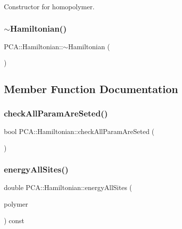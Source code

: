 Constructor for homopolymer. 

\hypertarget{class_p_c_a_1_1_hamiltonian_a87dcca06e1580312d8ffd4ef7fcad219}{}\label{class_p_c_a_1_1_hamiltonian_a87dcca06e1580312d8ffd4ef7fcad219} 
\subsubsection{\texorpdfstring{$\sim$\+Hamiltonian()}{~Hamiltonian()}}
{\footnotesize\ttfamily P\+C\+A\+::\+Hamiltonian\+::$\sim$\+Hamiltonian (\begin{DoxyParamCaption}{ }\end{DoxyParamCaption})}



\subsection{Member Function Documentation}
\hypertarget{class_p_c_a_1_1_hamiltonian_a3c9bddc6635c2a5a2ba0b2956126eb79}{}\label{class_p_c_a_1_1_hamiltonian_a3c9bddc6635c2a5a2ba0b2956126eb79} 
\subsubsection{\texorpdfstring{check\+All\+Param\+Are\+Seted()}{checkAllParamAreSeted()}}
{\footnotesize\ttfamily bool P\+C\+A\+::\+Hamiltonian\+::check\+All\+Param\+Are\+Seted (\begin{DoxyParamCaption}{ }\end{DoxyParamCaption})}

\hypertarget{class_p_c_a_1_1_hamiltonian_a0751ca31444a5de38e6e5d7d07843538}{}\label{class_p_c_a_1_1_hamiltonian_a0751ca31444a5de38e6e5d7d07843538} 
\subsubsection{\texorpdfstring{energy\+All\+Sites()}{energyAllSites()}}
{\footnotesize\ttfamily double P\+C\+A\+::\+Hamiltonian\+::energy\+All\+Sites (\begin{DoxyParamCaption}\item[{const \hyperlink{class_p_c_a_1_1_polymer_m_c}{Polymer\+MC} \&}]{polymer }\end{DoxyParamCaption}) const}

